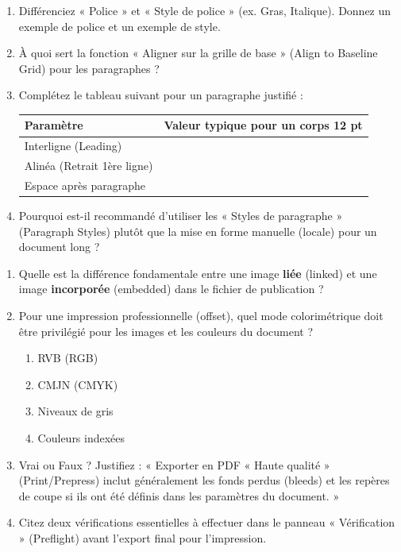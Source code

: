 \documentclass[11pt]{article}
\begin{document}
\begin{exercice}
\begin{enumerate}
    \item Différenciez « Police » et « Style de police » (ex. Gras, Italique). Donnez un exemple de police et un exemple de style.
    \item À quoi sert la fonction « Aligner sur la grille de base » (Align to Baseline Grid) pour les paragraphes ?
    \item Complétez le tableau suivant pour un paragraphe justifié :
    \begin{tabular}{|l|c|}
        \hline
        \textbf{Paramètre} & \textbf{Valeur typique pour un corps 12 pt} \\ \hline
        Interligne (Leading) & \underline{\hspace{3cm}} \\ \hline
        Alinéa (Retrait 1ère ligne) & \underline{\hspace{3cm}} \\ \hline
        Espace après paragraphe & \underline{\hspace{3cm}} \\ \hline
    \end{tabular}
    \item Pourquoi est-il recommandé d'utiliser les « Styles de paragraphe » (Paragraph Styles) plutôt que la mise en forme manuelle (locale) pour un document long ?
\end{enumerate}
\end{exercice}

\begin{exercice}
\begin{enumerate}
    \item Quelle est la différence fondamentale entre une image \textbf{liée} (linked) et une image \textbf{incorporée} (embedded) dans le fichier de publication ?
    \item Pour une impression professionnelle (offset), quel mode colorimétrique doit être privilégié pour les images et les couleurs du document ?
    \begin{enumerate}
        \item RVB (RGB)
        \item CMJN (CMYK)
        \item Niveaux de gris
        \item Couleurs indexées
    \end{enumerate}
    \item Vrai ou Faux ? Justifiez : « Exporter en PDF « Haute qualité » (Print/Prepress) inclut généralement les fonds perdus (bleeds) et les repères de coupe si ils ont été définis dans les paramètres du document. »
    \item Citez deux vérifications essentielles à effectuer dans le panneau « Vérification » (Preflight) avant l'export final pour l'impression.
\end{enumerate}
\end{exercice}
\end{document}
